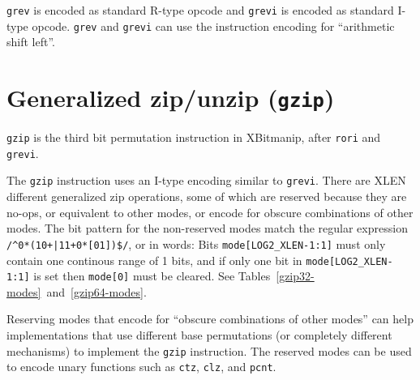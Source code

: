 

\texttt{grev} is encoded as standard R-type opcode and \texttt{grevi} is
encoded as standard I-type opcode. \texttt{grev} and \texttt{grevi} can
use the instruction encoding for ``arithmetic shift left''.

%
%
%


\section{Generalized zip/unzip (\texttt{gzip})}
\label{gzip}

{\tt gzip} is the third bit permutation instruction in XBitmanip, after {\tt rori}
and {\tt grevi}.

The {\tt gzip} instruction uses an I-type encoding similar to {\tt grevi}.
There are XLEN different generalized zip operations, some of which are reserved
because they are no-ops, or equivalent to other modes, or encode for obscure
combinations of other modes. The bit pattern for the non-reserved modes
match the regular expression {\tt /\^{}0*(10+|11+0*[01])\$/}, or in words:
Bits {\tt mode[LOG2\_XLEN-1:1]} must only contain one continous range of
1 bits, and if only one bit in {\tt mode[LOG2\_XLEN-1:1]} is set then
{\tt mode[0]} must be cleared. See Tables~\ref{gzip32-modes}~and~\ref{gzip64-modes}.

Reserving modes that encode for ``obscure combinations of other modes'' can help
implementations that use different base permutations (or completely different
mechanisms) to implement the {\tt gzip} instruction. The reserved modes can be
used to encode unary functions such as {\tt ctz}, {\tt clz}, and {\tt pcnt}.

